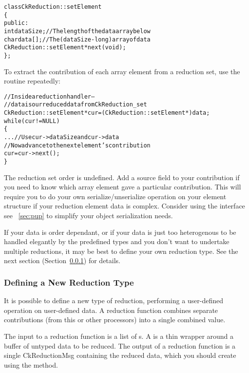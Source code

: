 \begin{alltt}
class CkReduction::setElement 
\{
public:
  int dataSize;//The length of the data array below
  char data[];//The (dataSize-long) array of data
  CkReduction::setElement *next(void);
\};
\end{alltt}

To extract the contribution of each array element from a reduction set, use the
 routine repeatedly:

\begin{alltt}
  //Inside a reduction handler-- 
  //  data is our reduced data from CkReduction_set
  CkReduction::setElement *cur=(CkReduction::setElement *)data;
  while (cur!=NULL)
  \{
    ... //Use cur->dataSize and cur->data
    //Now advance to the next element's contribution
    cur=cur->next();
  \}
\end{alltt}

The reduction set order is undefined.  Add a source field to your
contribution if you need to know which array element gave a particular
contribution.  This will require you to do your own
serialize/unserialize operation on your element structure if your
reduction element data is complex.  Consider using the 
interface see ~\ref{sec:pup} to simplify your object serialization
needs.

If your data is order dependant, or if your data is just too
heterogenous to be handled elegantly by the predefined types and you
don't want to undertake multiple reductions, it may be best to define
your own reduction type.  See the next section
(Section~\ref{new_type_reduction}) for details.


\subsubsection{Defining a New Reduction Type}

\label{new_type_reduction}

It is possible to define a new type of reduction, performing a 
user-defined operation on user-defined data.  A reduction function
combines separate contributions (from this or other processors)
into a single combined value.

The input to a reduction function is a list of s.
A  is a thin wrapper around a buffer of untyped data
to be reduced.  
The output of a reduction function is a single CkReductionMsg
containing the reduced data, which you should create using the
 method.  

